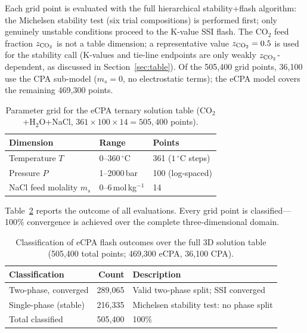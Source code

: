 \documentclass[preprint,12pt,number]{elsarticle}
\begin{document}
Each grid point is evaluated with the full hierarchical stability+flash algorithm: the Michelsen
stability test (six trial compositions) is performed first; only genuinely unstable
conditions proceed to the K-value SSI flash.
The CO$_2$ feed fraction $z_{\rm CO_2}$ is not a table dimension; a representative value
$z_{\rm CO_2} = 0.5$ is used for the stability call (K-values and tie-line endpoints are
only weakly $z_{\rm CO_2}$-dependent, as discussed in Section~\ref{sec:table}).
Of the 505{,}400 grid points, 36{,}100 use the CPA sub-model ($m_s = 0$, no
electrostatic terms); the eCPA model covers the remaining 469{,}300 points.

\begin{table}[H]
  \centering
  \caption{Parameter grid for the eCPA ternary solution table
           (CO$_2$+H$_2$O+NaCl, $361\times100\times14 = 505{,}400$ points).}
  \label{tab:ecpa_scan_grid}
  \begin{tabular}{lll}
    \toprule
    Dimension & Range & Points \\
    \midrule
    Temperature $T$ & $0$--$360\,^\circ$C & 361 ($1\,^\circ$C steps) \\
    Pressure $P$ & 1--2000\,bar & 100 (log-spaced) \\
    NaCl feed molality $m_s$ & 0--6\,mol\,kg$^{-1}$ & 14 \\
    \bottomrule
  \end{tabular}
\end{table}



Table~\ref{tab:ecpa_scan_convergence} reports the outcome of all evaluations.
Every grid point is classified---100\% convergence is achieved over the
complete three-dimensional domain.

\begin{table}[H]
  \centering
  \caption{Classification of eCPA flash outcomes over the full 3D solution table
           (505{,}400 total points; 469{,}300 eCPA, 36{,}100 CPA).}
  \label{tab:ecpa_scan_convergence}
  \begin{tabular}{lrl}
    \toprule
    Classification & Count & Description \\
    \midrule
    Two-phase, converged          & 289{,}065 & Valid two-phase split; SSI converged \\
    Single-phase (stable)         & 216{,}335 & Michelsen stability test: no phase split \\
    \midrule
    Total classified              & 505{,}400 & 100\% \\
    \bottomrule
  \end{tabular}
\end{table}
\end{document}
